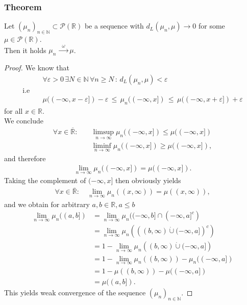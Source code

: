 \documentclass[11pt,a4paper]{article}
\begin{document}
\subsubsection{Theorem}
Let $(\mu_n)_{n\in\mathbb{N}}\subset\mathcal{P}(\mathbb{R})$ be a sequence with $d_L(\mu_n,\mu)\longrightarrow{}0$ for some $\mu\in\mathcal{P}(\mathbb{R})$. \vspace{1em}\\Then it holds \quad $\mu_n\,\xrightarrow{\,\,\,\omega\,\,\,}\mu$. 
\begin{proof}
We know that 
\begin{align*}
&\quad\forall\varepsilon>0\,\exists{}N\in\mathbb{N}\,\forall{}n\geq{}N\,:\,d_L(\mu_n,\mu)<\varepsilon\\\text{i.e}&\\&\quad\mu((-\infty,x-\varepsilon])-\varepsilon\,\leq\,\mu_n((-\infty,x])\,\leq\,\mu((-\infty,x+\varepsilon])+\varepsilon
\end{align*}
for all $x\in\mathbb{R}$.\vspace{1em}\\
We conclude
\begin{align*}
\forall{}x\in\overline{\mathbb{R}}: \quad &\limsup\limits_{n\rightarrow\infty}\mu_n((-\infty,x])\leq\mu((-\infty,x]) \\[5pt] &\liminf\limits_{n\rightarrow\infty}\mu_n((-\infty,x])\geq\mu((-\infty,x]),
\end{align*}
and therefore 
\begin{align*}
\lim\limits_{n\rightarrow\infty}\mu_n((-\infty,x]) = \mu((-\infty,x]).
\end{align*}
Taking the complement of $(-\infty,x]$ then obviously yields
\begin{align*}
\forall{}x\in\overline{\mathbb{R}}:\quad\lim\limits_{n\rightarrow\infty}\mu_n((x,\infty)) = \mu((x,\infty)),
\end{align*}
and we obtain for arbitrary $a,b\in\mathbb{R}, a\leq{}b$
\begin{align*}
\lim\limits_{n\rightarrow\infty}\mu_n((a,b]) &= \lim\limits_{n\rightarrow\infty}\mu_n((-\infty,b]\cap{}(-\infty,a]^c) \\&= \lim\limits_{n\rightarrow\infty}\mu_n\left(\left((b,\infty)\dot{\cup}(-\infty,a]\right)^c\right) \\&= 1 - \lim\limits_{n\rightarrow\infty}\mu_n\left((b,\infty)\dot{\cup}(-\infty,a]\right) \\&= 1 - \lim\limits_{n\rightarrow\infty} \mu_n\left((b,\infty)\right) - \mu_n((-\infty,a]) \\&= 1 - \mu((b,\infty)) - \mu((-\infty,a]) \\&= \mu((a,b]).
\end{align*}
This yields weak convergence of the sequence $(\mu_n)_{n\in\mathbb{N}}$.
\end{proof}
\end{document}
